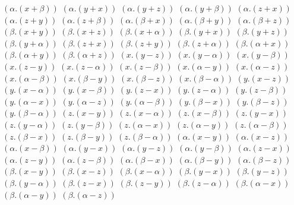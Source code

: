 $ (\alpha . (x + \beta)) $
$ (\alpha . (y + x)) $
$ (\alpha . (y + z)) $
$ (\alpha . (y + \beta)) $
$ (\alpha . (z + x)) $
$ (\alpha . (z + y)) $
$ (\alpha . (z + \beta)) $
$ (\alpha . (\beta + x)) $
$ (\alpha . (\beta + y)) $
$ (\alpha . (\beta + z)) $
$ (\beta . (x + y)) $
$ (\beta . (x + z)) $
$ (\beta . (x + \alpha)) $
$ (\beta . (y + x)) $
$ (\beta . (y + z)) $
$ (\beta . (y + \alpha)) $
$ (\beta . (z + x)) $
$ (\beta . (z + y)) $
$ (\beta . (z + \alpha)) $
$ (\beta . (\alpha + x)) $
$ (\beta . (\alpha + y)) $
$ (\beta . (\alpha + z)) $
$ (x . (y - z)) $
$ (x . (y - \alpha)) $
$ (x . (y - \beta)) $
$ (x . (z - y)) $
$ (x . (z - \alpha)) $
$ (x . (z - \beta)) $
$ (x . (\alpha - y)) $
$ (x . (\alpha - z)) $
$ (x . (\alpha - \beta)) $
$ (x . (\beta - y)) $
$ (x . (\beta - z)) $
$ (x . (\beta - \alpha)) $
$ (y . (x - z)) $
$ (y . (x - \alpha)) $
$ (y . (x - \beta)) $
$ (y . (z - x)) $
$ (y . (z - \alpha)) $
$ (y . (z - \beta)) $
$ (y . (\alpha - x)) $
$ (y . (\alpha - z)) $
$ (y . (\alpha - \beta)) $
$ (y . (\beta - x)) $
$ (y . (\beta - z)) $
$ (y . (\beta - \alpha)) $
$ (z . (x - y)) $
$ (z . (x - \alpha)) $
$ (z . (x - \beta)) $
$ (z . (y - x)) $
$ (z . (y - \alpha)) $
$ (z . (y - \beta)) $
$ (z . (\alpha - x)) $
$ (z . (\alpha - y)) $
$ (z . (\alpha - \beta)) $
$ (z . (\beta - x)) $
$ (z . (\beta - y)) $
$ (z . (\beta - \alpha)) $
$ (\alpha . (x - y)) $
$ (\alpha . (x - z)) $
$ (\alpha . (x - \beta)) $
$ (\alpha . (y - x)) $
$ (\alpha . (y - z)) $
$ (\alpha . (y - \beta)) $
$ (\alpha . (z - x)) $
$ (\alpha . (z - y)) $
$ (\alpha . (z - \beta)) $
$ (\alpha . (\beta - x)) $
$ (\alpha . (\beta - y)) $
$ (\alpha . (\beta - z)) $
$ (\beta . (x - y)) $
$ (\beta . (x - z)) $
$ (\beta . (x - \alpha)) $
$ (\beta . (y - x)) $
$ (\beta . (y - z)) $
$ (\beta . (y - \alpha)) $
$ (\beta . (z - x)) $
$ (\beta . (z - y)) $
$ (\beta . (z - \alpha)) $
$ (\beta . (\alpha - x)) $
$ (\beta . (\alpha - y)) $
$ (\beta . (\alpha - z)) $
